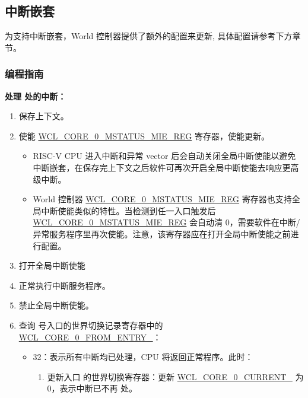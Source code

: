 \documentclass[main\_\_CN.tex]{subfiles}
\begin{document}
\subsection{中断嵌套}

为支持中断嵌套，World 控制器提供了额外的配置来更新, 具体配置请参考下方章节。





\subsubsection{编程指南} \label{sec:wctrl-prog-step}

\textbf{处理  处的中断：\label{step:wctrl-start-interrput}}
    \begin{enumerate}
        \item 保存上下文。
        \item 使能 \hyperref[regdesc:WCLCORE0MSTATUSMIEREG]{WCL\_CORE\_0\_MSTATUS\_MIE\_REG} 寄存器，使能更新。
        \begin{itemize}
            \item RISC-V CPU 进入中断和异常 vector 后会自动关闭全局中断使能以避免中断嵌套，在保存完上下文之后软件可再次开启全局中断使能去响应更高级中断。
            \item World 控制器  \hyperref[regdesc:WCLCORE0MSTATUSMIEREG]{WCL\_CORE\_0\_MSTATUS\_MIE\_REG} 寄存器也支持全局中断使能类似的特性。当检测到任一入口触发后 \hyperref[regdesc:WCLCORE0MSTATUSMIEREG]{WCL\_CORE\_0\_MSTATUS\_MIE\_REG} 会自动清 0，需要软件在中断/异常服务程序里再次使能。注意，该寄存器应在打开全局中断使能之前进行配置。
        \end{itemize}
        \item 打开全局中断使能
        \item 正常执行中断服务程序。\label{step:interrupt-process-normal}
        \item 禁止全局中断使能。
        \item 查询  号入口的世界切换记录寄存器中的 \hyperref[fielddesc:WCLCORE0FROMENTRY0]{WCL\_CORE\_0\_FROM\_ENTRY\_}：\label{step:interrupt_process_update}
            \begin{itemize}
                \item 32：表示所有中断均已处理，CPU 将返回正常程序。此时：
                \begin{enumerate}
                    \item 更新入口  的世界切换寄存器：更新  \hyperref[fielddesc:WCLCORE0CURRENT0]{WCL\_CORE\_0\_CURRENT\_} 为 0，表示中断已不再  处。

\end{enumerate}
\end{itemize}
\end{enumerate}
\end{document}
